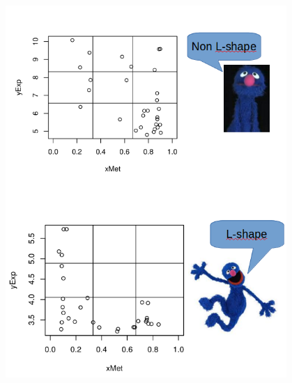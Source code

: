 \documentclass[handout]{beamer}
\begin{document}
\begin{frame}
\begin{columns}
\begin{column}[t]{0.5\textwidth}
	\end{column}
	\begin{column}[t]{0.5\textwidth}%
		\begin{center}
			\begin{figure}[h]          
				\includegraphics[height=0.8\textheight]{images/LshapeNonLshape.png}
			\end{figure}
		\end{center}
	\end{column}
\end{columns}	
\end{frame}
\end{document}
